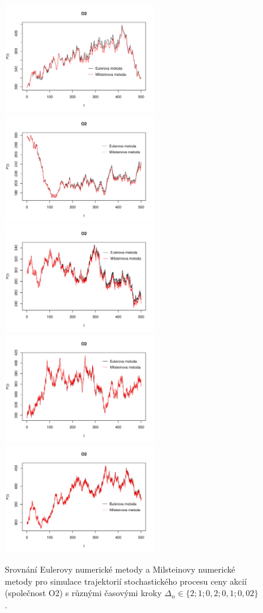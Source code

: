\documentclass[a4paper,12pt]{report}
\theoremstyle{definition} \newtheorem{definice}[veta]{Definice}
\theoremstyle{remark}
\begin{document}
\begin{figure}[!htbp]
  \centering 
	\includegraphics[width=6.6cm, clip, trim= 0 15 25 50]{IMG/e_m_o2_v3_q0_5.pdf}\quad
	\includegraphics[width=6.6cm, clip, trim= 0 15 25 50]{IMG/e_m_o2_v3_q1.pdf}\\
	\includegraphics[width=6.6cm, clip, trim= 0 15 25 50]{IMG/e_m_o2_v3_q5.pdf}\quad
	\includegraphics[width=6.6cm, clip, trim= 0 15 25 50]{IMG/e_m_o2_v3_q10.pdf}\\
	\includegraphics[width=6.6cm, clip, trim= 0 15 25 50]{IMG/e_m_o2_v3_q50.pdf}
  \caption{Srovnání Eulerovy numerické metody a Milsteinovy numerické metody pro simulace trajektorií stochastického procesu ceny akcií (společnost O2) s různými časovými kroky $\Delta_n\in\{2; 1; 0,2; 0,1; 0,02\}$.}  \label{euler_milstein_q}
\end{figure}
\end{document}
